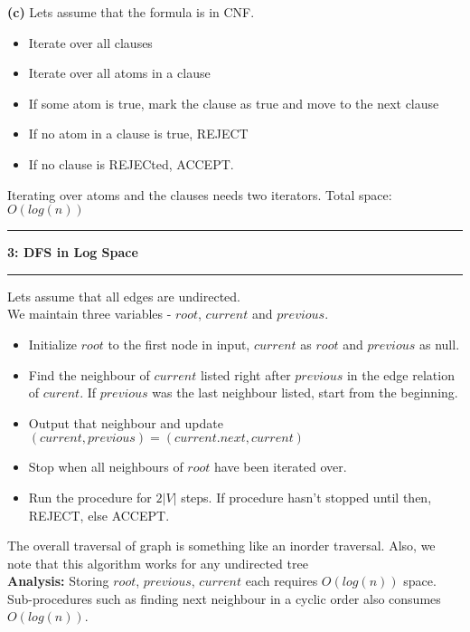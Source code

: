 \documentclass[11pt]{article}
\newcommand\question[2]{\vspace{.25in}\hrule\textbf{#1: #2}\vspace{.5em}\hrule\vspace{.10in}}
\renewcommand\part[1]{\vspace{.10in}\textbf{(#1)}}
\newcommand\anlys{\vspace{.05in}\textbf{Analysis: }}
\begin{document}
\part{c}
Lets assume that the formula is in CNF. 
\vspace{-0.10in}
\begin{itemize}
\setlength\itemsep{0.01in}
\item Iterate over all clauses
\item Iterate over all atoms in a clause
\item If some atom is true, mark the clause as true and move to the next clause
\item If no atom in a clause is true, REJECT
\item If no clause is REJECted, ACCEPT.
\end{itemize}
\vspace{-0.1in}
Iterating over atoms and the clauses needs two iterators. Total space: $O(log(n))$
\question{3}{DFS in Log Space}
Lets assume that all edges are undirected.\\
We maintain three variables - $root$, $current$ and $previous$.
\vspace{-0.10in}
\begin{itemize}
\setlength\itemsep{0.01in}
\item Initialize $root$ to the first node in input, $current$ as $root$ and $previous$ as null.
\item Find the neighbour of $current$ listed right after $previous$ in the edge relation of $curent$. If $previous$ was the last neighbour listed, start from the beginning.
\item Output that neighbour and update $(current, previous) = (current.next, current)$
\item Stop when all neighbours of $root$ have been iterated over.
\item Run the procedure for $2|V|$ steps. If procedure hasn't stopped until then, REJECT, else ACCEPT.
\end{itemize}
\vspace{-0.1in}
The overall traversal of graph is something like an inorder traversal. 
Also, we note that this algorithm works for any undirected tree\\
\anlys Storing $root$, $previous$, $current$ each requires $O(log(n))$ space. Sub-procedures 
such as finding next neighbour in a cyclic order also consumes $O(log(n))$.
\end{document}
